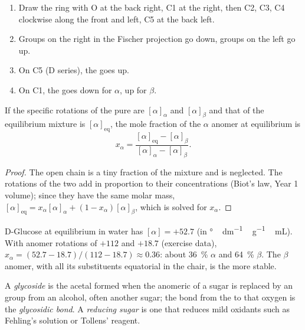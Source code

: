 \begin{method}\label{met:b2:biomolecules:haworth}
\begin{enumerate}
  \item Draw the ring with O at the back right, C1 at the right, then C2, C3, C4 clockwise along the
        front and left, C5 at the back left.
  \item Groups on the right in the Fischer projection go down, groups on the left go up.
  \item On C5 (D series), the  goes up.
  \item On C1, the  goes down for $\alpha$, up for $\beta$.
\end{enumerate}
\end{method}

\begin{proposition}\label{prop:b2:biomolecules:mutarotation}
If the specific rotations of the pure  are $[\alpha]_\alpha$ and $[\alpha]_\beta$ and that of the
equilibrium mixture is $[\alpha]_{\mathrm{eq}}$, the mole fraction of the $\alpha$ anomer at
equilibrium is
\begin{equation*}
x_\alpha = \frac{[\alpha]_{\mathrm{eq}} - [\alpha]_\beta}{[\alpha]_\alpha - [\alpha]_\beta}.
\end{equation*}
\end{proposition}

\begin{proof}
The open chain is a tiny fraction of the mixture and is neglected. The rotations of the two 
add in proportion to their concentrations (Biot's law, Year 1 volume); since they have the same molar
mass, $[\alpha]_{\mathrm{eq}} = x_\alpha[\alpha]_\alpha + (1 - x_\alpha)[\alpha]_\beta$, which is solved
for $x_\alpha$.
\end{proof}

D-Glucose at equilibrium in water has $[\alpha] = +52.7$ (in \unit{\degree\,dm^{-1}\,g^{-1}\,mL}).
With anomer rotations of $+112$ and $+18.7$ (exercise data), $x_\alpha = (52.7 - 18.7)/(112 - 18.7)
\approx 0.36$: about 36~\% $\alpha$ and 64~\% $\beta$. The $\beta$ anomer, with all its
substituents equatorial in the chair, is the more stable.

\begin{definition}[Glycosides]\label{def:b2:biomolecules:glycoside}
A \emph{glycoside} is the acetal formed when the anomeric  of a sugar is replaced
by an  group from an alcohol, often another sugar; the bond from the  to that
oxygen is the \emph{glycosidic bond}. A \emph{reducing sugar}
is one that reduces mild oxidants such as Fehling's solution or Tollens' reagent.
\end{definition}

